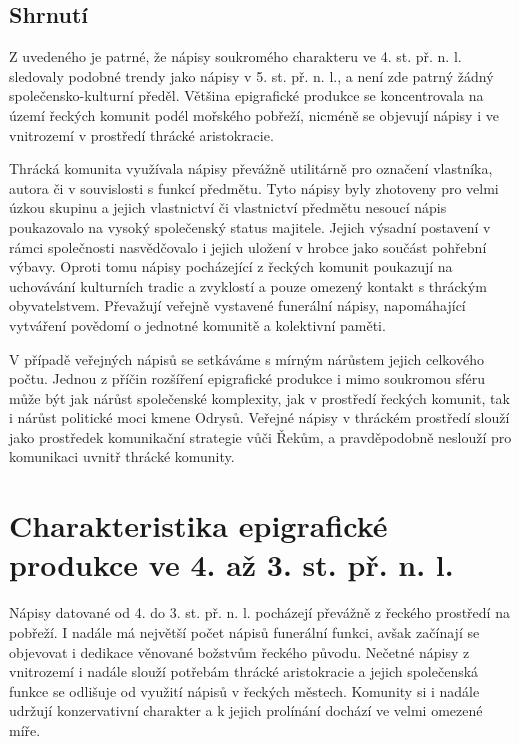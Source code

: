 \subsection[shrnutí-7]{Shrnutí}

Z uvedeného je patrné, že nápisy soukromého charakteru ve 4. st. př. n. l. sledovaly podobné trendy jako nápisy v 5. st. př. n. l., a není zde patrný žádný společensko-kulturní předěl. Většina epigrafické produkce se koncentrovala na území řeckých komunit podél mořského pobřeží, nicméně se objevují nápisy i ve vnitrozemí v prostředí thrácké aristokracie.

Thrácká komunita využívala nápisy převážně utilitárně pro označení vlastníka, autora či v souvislosti s funkcí předmětu. Tyto nápisy byly zhotoveny pro velmi úzkou skupinu a jejich vlastnictví či vlastnictví předmětu nesoucí nápis poukazovalo na vysoký společenský status majitele. Jejich výsadní postavení v rámci společnosti nasvědčovalo i jejich uložení v hrobce jako součást pohřební výbavy. Oproti tomu nápisy pocházející z řeckých komunit poukazují na uchovávání kulturních tradic a zvyklostí a pouze omezený kontakt s thráckým obyvatelstvem. Převažují veřejně vystavené funerální nápisy, napomáhající vytváření povědomí o jednotné komunitě a kolektivní paměti.

V případě veřejných nápisů se setkáváme s mírným nárůstem jejich celkového počtu. Jednou z příčin rozšíření epigrafické produkce i mimo soukromou sféru může být jak nárůst společenské komplexity, jak v prostředí řeckých komunit, tak i nárůst politické moci kmene Odrysů. Veřejné nápisy v thráckém prostředí slouží jako prostředek komunikační strategie vůči Řekům, a pravděpodobně neslouží pro komunikaci uvnitř thrácké komunity.

\section[charakteristika-epigrafické-produkce-ve-4.-až-3.-st.-př.-n.-l.]{Charakteristika epigrafické produkce ve 4. až 3. st. př. n. l.}

Nápisy datované od 4. do 3. st. př. n. l. pocházejí převážně z řeckého prostředí na pobřeží. I nadále má největší počet nápisů funerální funkci, avšak začínají se objevovat i dedikace věnované božstvům řeckého původu. Nečetné nápisy z vnitrozemí i nadále slouží potřebám thrácké aristokracie a jejich společenská funkce se odlišuje od využití nápisů v řeckých městech. Komunity si i nadále udržují konzervativní charakter a k jejich prolínání dochází ve velmi omezené míře.

